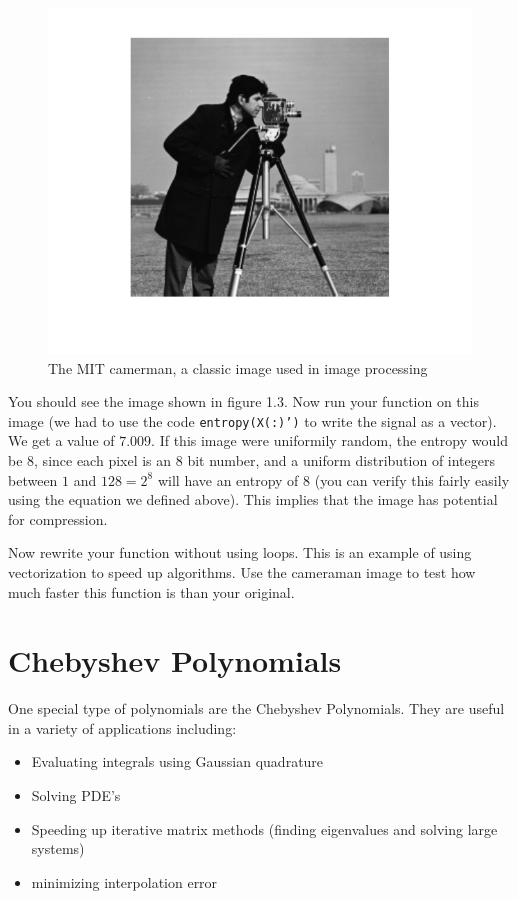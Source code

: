 \begin{figure}[h!]
\begin{center}
\includegraphics{./Figures/cameramanClean.pdf}
\end{center}
\caption{The MIT camerman, a classic image used in image processing}
\end{figure}
You should see the image shown in figure 1.3. Now run your function on this image (we had to use the code {\tt entropy(X(:)')} to write the signal as a vector). We get a value of $7.009$. If this image were uniformily random, the entropy would be $8$, since each pixel is an $8$ bit number, and a uniform distribution of integers between $1$ and $128 = 2^8$ will have an entropy of $8$ (you can verify this fairly easily using the equation we defined above). This implies that the image has potential for compression.

\begin{problem}
Now rewrite your function without using loops. This is an example of using vectorization to speed up algorithms. Use the cameraman image to test how much faster this function is than your original.
\end{problem}

\section*{Chebyshev Polynomials}

One special type of polynomials are the Chebyshev Polynomials. They are useful in a variety of applications including:
\begin{itemize}
\item Evaluating integrals using Gaussian quadrature
\item Solving PDE's
\item Speeding up iterative matrix methods (finding eigenvalues and solving large systems)
\item minimizing interpolation error
\end{itemize}

